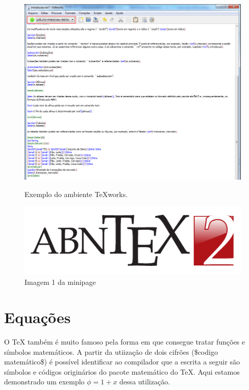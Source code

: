\begin{figure}[htbp]
\caption{\small Exemplo do ambiente TeXworks.}
\centering
\includegraphics[scale=0.50]{figs/tex-exemplo.png}
\label{f.disposicao-mercado}
\end{figure}

\begin{figure}[htbp]
    \centering
    \caption{Imagem 1 da minipage} \label{fig-minipage-imagem1}
    \includegraphics[scale=0.9]{figs/abntex2-modelo-img-marca.pdf}
\end{figure}


\section{Equações}
\label{s.equacoes}

O TeX também é muito famoso pela forma em que consegue tratar funções e símbolos matemáticos. A partir da utiização de dois cifrões (\$codigo matemático\$) é possível identificar ao compilador que a escrita a seguir são símbolos e códigos originários do pacote matemático do TeX. Aqui estamos demonstrado um exemplo $\phi = 1 + x$ dessa utilização.

